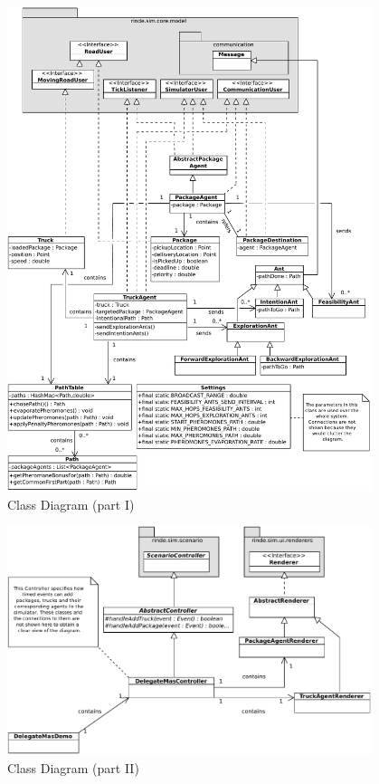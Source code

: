 \newpage
\vfill
\begin{figure}[!h]
        \vspace{0.5pt}
        \begin{center}
                \includegraphics[width = 0.95\textwidth]{./diagrams/ClassDiagram.pdf}
		\end{center}
		\caption{Class Diagram (part I)}
		\label{Fig:ClassDiagram1}
        \vspace{0.5pt}
\end{figure}

\vfill
\newpage

\begin{figure}[!h]
        \vspace{0.5pt}
        \begin{center}
                \includegraphics[width = 0.95\textwidth]{./diagrams/ClassDiagram2.pdf}
		\end{center}
		\caption{Class Diagram (part II)}
		\label{Fig:ClassDiagram2}
        \vspace{0.5pt}
\end{figure}